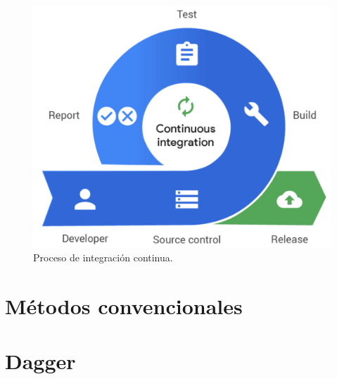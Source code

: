 \begin{figure}
  \centerline{\includegraphics[width=15cm]{figuras/ci}}
  \caption{Proceso de integración continua.\cite{img.ci}}
  \label{ci}
\end{figure}


\section{Métodos convencionales}

\section{Dagger}
